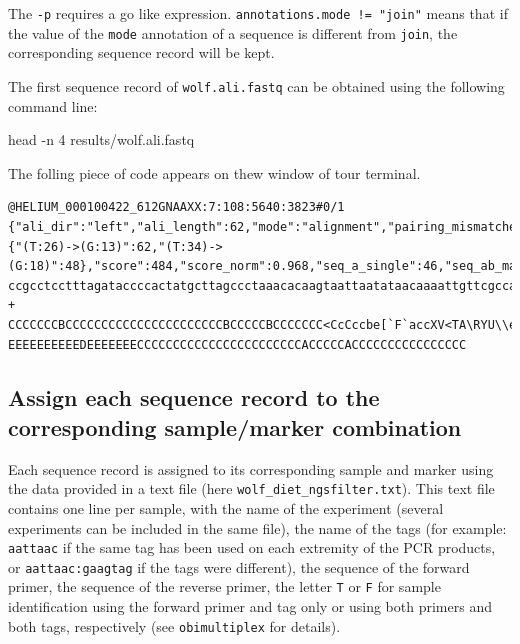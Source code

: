 \documentclass[
  letterpaper,
  DIV=11,
  numbers=noendperiod]{scrreprt}
\newenvironment{Shaded}{\begin{snugshade}}{\end{snugshade}}
\newcommand{\AttributeTok}[1]{\textcolor[rgb]{0.40,0.45,0.13}{#1}}
\newcommand{\FunctionTok}[1]{\textcolor[rgb]{0.28,0.35,0.67}{#1}}
\newcommand{\NormalTok}[1]{\textcolor[rgb]{0.00,0.23,0.31}{#1}}
\begin{document}
The \texttt{-p} requires a go like expression.
\texttt{annotations.mode\ !=\ "join"} means that if the value of the
\texttt{mode} annotation of a sequence is different from \texttt{join},
the corresponding sequence record will be kept.

The first sequence record of \texttt{wolf.ali.fastq} can be obtained
using the following command line:

\begin{Shaded}
\begin{Highlighting}[]
\FunctionTok{head} \AttributeTok{{-}n}\NormalTok{ 4 results/wolf.ali.fastq}
\end{Highlighting}
\end{Shaded}

The folling piece of code appears on thew window of tour terminal.

\begin{verbatim}
@HELIUM_000100422_612GNAAXX:7:108:5640:3823#0/1 {"ali_dir":"left","ali_length":62,"mode":"alignment","pairing_mismatches":{"(T:26)->(G:13)":62,"(T:34)->(G:18)":48},"score":484,"score_norm":0.968,"seq_a_single":46,"seq_ab_match":60,"seq_b_single":46}
ccgcctcctttagataccccactatgcttagccctaaacacaagtaattaatataacaaaattgttcgccagagtactaccggcaatagcttaaaactcaaaggacttggcggtgctttatacccttctagaggagcctgttctaaggaggcgg
+
CCCCCCCBCCCCCCCCCCCCCCCCCCCCCCBCCCCCBCCCCCCC<CcCccbe[`F`accXV<TA\RYU\\ee_e[XZ[XEEEEEEEEEE?EEEEEEEEEEDEEEEEEECCCCCCCCCCCCCCCCCCCCCCCACCCCCACCCCCCCCCCCCCCCC
\end{verbatim}

\hypertarget{assign-each-sequence-record-to-the-corresponding-samplemarker-combination}{%
\subsection{Assign each sequence record to the corresponding
sample/marker
combination}\label{assign-each-sequence-record-to-the-corresponding-samplemarker-combination}}

Each sequence record is assigned to its corresponding sample and marker
using the data provided in a text file (here
\texttt{wolf\_diet\_ngsfilter.txt}). This text file contains one line
per sample, with the name of the experiment (several experiments can be
included in the same file), the name of the tags (for example:
\texttt{aattaac} if the same tag has been used on each extremity of the
PCR products, or \texttt{aattaac:gaagtag} if the tags were different),
the sequence of the forward primer, the sequence of the reverse primer,
the letter \texttt{T} or \texttt{F} for sample identification using the
forward primer and tag only or using both primers and both tags,
respectively (see \texttt{obimultiplex} for details).
\end{document}
